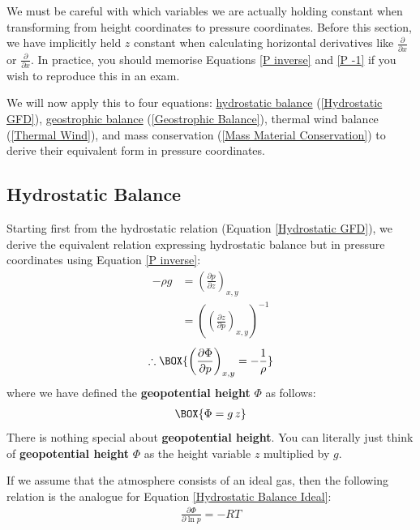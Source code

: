 We must be careful with which variables we are actually holding constant when transforming from height coordinates to pressure coordinates. Before this section, we have implicitly held $z$ constant when calculating horizontal derivatives like $\frac{\partial}{\partial x}$ or $\frac{\partial}{\partial x}$. In practice, you should memorise Equations \ref{P inverse} and \ref{P -1} if you wish to reproduce this in an exam.

We will now apply this to four equations: \hyperref[Hydrostatic GFD Box]{hydrostatic balance} (\ref{Hydrostatic GFD}), \hyperref[Geostrophic Box]{geostrophic balance} (\ref{Geostrophic Balance}), thermal wind balance (\ref{Thermal Wind}), and mass conservation (\ref{Mass Material Conservation}) to derive their equivalent form in pressure coordinates. 

\subsection{Hydrostatic Balance}

Starting first from the hydrostatic relation (Equation \ref{Hydrostatic GFD}), we derive the equivalent relation expressing hydrostatic balance but in pressure coordinates using Equation \ref{P inverse}:
\begin{align*}
    -\rho g &= \left( \frac{\partial p}{\partial z} \right)_{x,y}
    \\
    &=\left( \left( \frac{\partial z}{\partial p} \right)_{x,y} \right)^{-1}
\end{align*}
\begin{align}
    \label{Hydrostatic Pressure}
    \therefore \BOX{
        \left( \frac{\partial \Phi}{\partial p} \right)_{x,y}
        =-\frac{1}{\rho}
    }
\end{align}
where we have defined the \textbf{geopotential height} $\Phi$ as follows:
\begin{align}
    \BOX{\Phi =g\,z}
\end{align}
There is nothing special about \textbf{geopotential height}. You can literally just think of \textbf{geopotential height} $\Phi$ as the height variable $z$ multiplied by $g$.

If we assume that the atmosphere consists of an ideal gas, then the following relation is the analogue for Equation \ref{Hydrostatic Balance Ideal}:
\begin{align}
    \boxed{\frac{\partial \Phi}{\partial \ln p}=-RT}
    \label{Hydrostatic Pressure Ideal}
\end{align}

